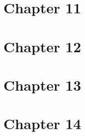 \documentclass{wileySix}
\begin{document}
\chapter{Chapter 11}


\chapter{Chapter 12}


\chapter{Chapter 13}


\chapter{Chapter 14}


 



\printindex


\end{document}
